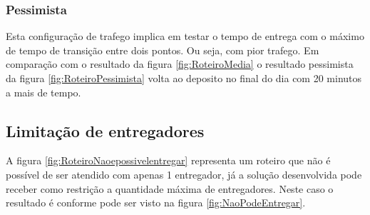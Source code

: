 \subsubsection{Pessimista}

Esta configuração de trafego implica em testar o tempo de entrega com o máximo de tempo de transição entre dois pontos. Ou seja, com pior trafego.
Em comparação com o resultado da figura \ref{fig:RoteiroMedia} o resultado pessimista da figura \ref{fig:RoteiroPessimista} volta ao deposito no final do dia com 20 minutos a mais de tempo.

\begin{center}
	\label{fig:RoteiroPessimista}
\end{center}



\subsection{Limitação de entregadores}

A figura \ref{fig:RoteiroNaoepossivelentregar} representa um roteiro que não é possível de ser atendido com apenas 1 entregador, já a solução desenvolvida pode receber como restrição a quantidade máxima de entregadores. Neste caso o resultado é conforme pode ser visto na figura \ref{fig:NaoPodeEntregar}.

\begin{center}
	\label{fig:RoteiroNaoepossivelentregarcomapenas1}
\end{center}

